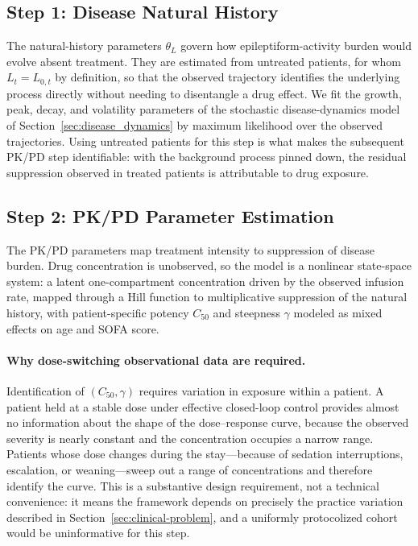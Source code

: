 \subsection{Step 1: Disease Natural History}
The natural-history parameters $\theta_L$ govern how epileptiform-activity burden would evolve absent
treatment. They are estimated from untreated patients, for whom $L_t = L_{0,t}$ by definition, so that
the observed trajectory identifies the underlying process directly without needing to disentangle a
drug effect. We fit the growth, peak, decay, and volatility parameters of the stochastic
disease-dynamics model of Section~\ref{sec:disease_dynamics} by maximum likelihood over the observed
trajectories. Using untreated patients for this step is what makes the subsequent PK/PD step
identifiable: with the background process pinned down, the residual suppression observed in treated
patients is attributable to drug exposure.

\subsection{Step 2: PK/PD Parameter Estimation}
The PK/PD parameters map treatment intensity to suppression of disease burden. Drug concentration is
unobserved, so the model is a nonlinear state-space system: a latent one-compartment concentration
driven by the observed infusion rate, mapped through a Hill function to multiplicative suppression of
the natural history, with patient-specific potency $C_{50}$ and steepness $\gamma$ modeled as
mixed effects on age and SOFA score.

\paragraph{Why dose-switching observational data are required.}
Identification of $(C_{50},\gamma)$ requires variation in exposure within a patient. A patient held at
a stable dose under effective closed-loop control provides almost no information about the shape of
the dose--response curve, because the observed severity is nearly constant and the concentration
occupies a narrow range. Patients whose dose changes during the stay---because of sedation
interruptions, escalation, or weaning---sweep out a range of concentrations and therefore identify the
curve. This is a substantive design requirement, not a technical convenience: it means the framework
depends on precisely the practice variation described in Section~\ref{sec:clinical-problem}, and a
uniformly protocolized cohort would be uninformative for this step.

